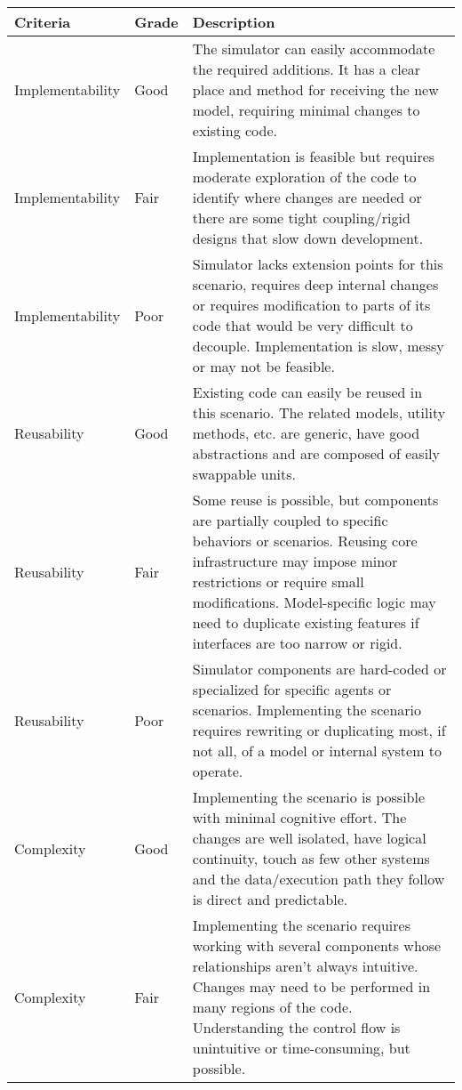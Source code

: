 \documentclass[twoside, 11pt]{article}
\begin{document}
\begin{center}
  \begin{table}
    \begin{tabularx}{\textwidth}{ | p{2.9cm} | l | X | } 
      \hline
      Criteria & Grade & Description \\ 
      \hline
      Implementability & Good & 
      The simulator can easily accommodate the required additions. It has a clear place and method for receiving the new model, requiring minimal changes to existing code.
      \\ 
      \hline
      Implementability & Fair & 
      Implementation is feasible but requires moderate exploration of the code to identify where changes are needed or there are some tight coupling/rigid designs that slow down development.
      \\ 
      \hline
      Implementability & Poor & 
      Simulator lacks extension points for this scenario, requires deep internal changes or requires modification to parts of its code that would be very difficult to decouple. Implementation is slow, messy or may not be feasible.
      \\ 
      \hline
      Reusability & Good & 
      Existing code can easily be reused in this scenario. The related models, utility methods, etc. are  generic, have good abstractions and are composed of easily swappable units.
      \\ 
      \hline
      Reusability & Fair & 
      Some reuse is possible, but components are partially coupled to specific behaviors or scenarios. Reusing core infrastructure may impose minor restrictions or require small modifications. Model-specific logic may need to duplicate existing features if interfaces are too narrow or rigid.
      \\ 
      \hline
      Reusability & Poor & 
      Simulator components are hard-coded or specialized for specific agents or scenarios. Implementing the scenario requires rewriting or duplicating most, if not all, of a model or internal system to operate. 
      \\ 
      \hline
      Complexity & Good & 
      Implementing the scenario is possible with minimal cognitive effort. The changes are well isolated, have logical continuity, touch as few other systems and the data/execution path they follow is direct and predictable.
      \\ 
      \hline
      Complexity & Fair & 
      Implementing the scenario requires working with several components whose relationships aren't always intuitive. Changes may need to be performed in many regions of the code. Understanding the control flow is unintuitive or time-consuming, but possible.

\end{tabularx}
\end{table}
\end{center}
\end{document}
